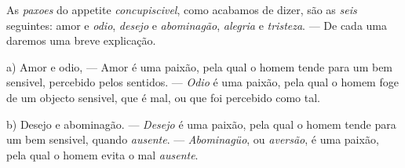 
 
As \emph{paxoes} do appetite \emph{concupiscivel}, como acabamos de dizer, são as \emph{seis} seguintes: amor e \emph{odio}, \emph{desejo} e \emph{abominagão}, \emph{alegria} e \emph{tristeza}. --- De cada uma daremos uma breve explicação.

a) Amor e odio, --- Amor é uma paixão, pela qual o homem tende para um bem sensivel, percebido pelos sentidos. --- \emph{Odio} é uma paixão, pela qual o homem foge de um objecto sensivel, que é mal, ou que foi percebido como tal.

b) Desejo e abominagão. --- \emph{Desejo} é uma paixão, pela qual o homem tende para um bem sensivel, quando \emph{ausente}. --- \emph{Abominagüo}, ou \emph{aversão}, é uma paixão, pela qual o homem evita o mal \emph{ausente}.


